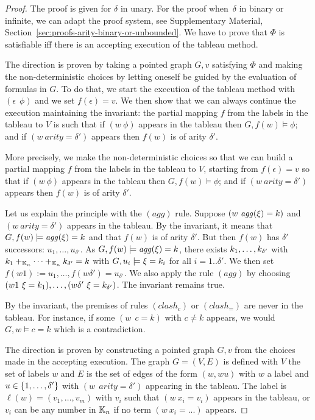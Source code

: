 \begin{proof}
The proof is given for $\delta$ in unary.  For the proof when~$\delta$ in binary or infinite, we can adapt the proof system, see Supplementary Material, Section~\ref{sec:proofs-arity-binary-or-unbounded}.
   We have to prove that $\Phi$ is satisfiable iff there is an accepting execution of the tableau method.
    
    The \fbox{$\Rightarrow$} direction is proven by taking a pointed graph $G, v$ satisfying $\Phi$ and making the non-deterministic choices by letting oneself be guided by the evaluation of formulas in $G$. 
    To do that, we start the execution of the tableau method with $(\epsilon~~ \phi)$ and we set $f(\epsilon) = v$. We then show that we can always continue the execution maintaining the invariant:
    the partial mapping $f$ from the labels in the tableau to $V$ is such that if $(w~\phi)$ appears in the tableau then $G, f(w) \models \phi$; and if $(w~arity=\delta')$ appears then $f(w)$ is of arity $\delta'$.
    
    More precisely, we make the non-deterministic choices so that we can build a partial mapping $f$ from the labels in the tableau to $V$, starting from $f(\epsilon) = v$ so that if $(w~\phi)$ appears in the tableau then $G, f(w) \models \phi$; and if $(w~arity=\delta')$ appears then $f(w)$ is of arity $\delta'$. 
    
    Let us explain the principle with the $(agg)$ rule. Suppose $(w~\mathit{agg}(\xi) = k)$ and $(w~arity=\delta')$ appears in the tableau. By the invariant, it means that $G, f(w) \models \mathit{agg}(\xi) = k$ and that $f(w)$ is of arity $\delta'$. But then $f(w)$ has $\delta'$ successors: $u_1, \dots, u_{\delta'}$. As $G, f(w) \models \mathit{agg}(\xi) = k$, there exists $k_{1}, \dots, k_{{\delta'}}$ with $k_{1} +_{\mathbb K_n} 
 \dotsb +_{\mathbb K_n} k_{\delta'} = k$ with $G, u_i \models \xi = k_i$ for all $i=1..\delta'$.
We then set $f(w1) := u_1, \dots, f(w\delta') = u_{\delta'}$. We also apply the rule $(agg)$ by choosing $(w1~\xi = k_{1}), \dotsc, (w \delta'~\xi = k_{{\delta'}})$. The invariant remains true.

By the invariant, the premises of rules $(clash_c)$ or $(clash_=)$ are never in the tableau. For instance, if some $(w~~c=k)$ with $c \neq k$ appears, we would $G, w \models c=k$ which is a contradiction.


    
    The \fbox{$\Leftarrow$} direction is proven by constructing a pointed graph $G, v$ from the choices made in the accepting execution. The graph $G = (V, E)$ is defined with $V$ the set of labels $w$ and $E$ is the set of edges of the form $(w, wu)$ with $w$ a label and $u \in {\{1, \dots, \delta'\}}$ with $(w~~arity=\delta')$ appearing in the tableau. The label is $\ell(w) = (v_1, \dots, v_m)$ with $v_i$ such that $(w~x_i=v_i)$ appears in the tableau, or $v_i$ can be any number in $\mathbb K_n$ if no term $(w~x_i=...)$ appears.


\end{proof}

